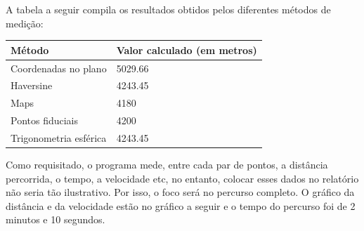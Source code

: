 \documentclass{article}
\begin{document}
\qquad A tabela a seguir compila os resultados obtidos pelos diferentes métodos de medição:

\vspace{0.5cm}

{\centering
\begin{tabular}{ | l | l | }
    \hline
    Método & Valor calculado (em metros)\\ \hline
    Coordenadas no plano & 5029.66 \\ \hline
    Haversine & 4243.45 \\\hline
    Maps & 4180 \\ \hline
    Pontos fiduciais & 4200 \\ \hline
    Trigonometria esférica & 4243.45 \\ \hline
\end{tabular}
\par
}


\vspace{0.5cm}

\qquad Como requisitado, o programa mede, entre cada par de pontos, a distância percorrida, o tempo, a velocidade etc, no entanto, colocar esses dados no relatório não seria tão ilustrativo. Por isso, o foco será no percurso completo. O gráfico da distância e da velocidade estão no gráfico a seguir e o tempo do percurso foi de 2 minutos e 10 segundos.
\end{document}
